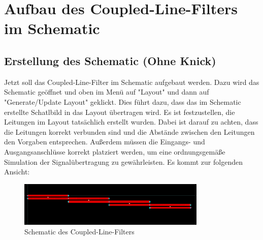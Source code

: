 \section{Aufbau des Coupled-Line-Filters im Schematic}
\subsection{Erstellung des Schematic (Ohne Knick)}
Jetzt soll das Coupled-Line-Filter im Schematic aufgebaut werden. Dazu wird das Schematic geöffnet und oben im Menü auf "Layout" und dann auf "Generate/Update Layout" geklickt. Dies führt dazu, dass das im Schematic erstellte Schatlbild in das Layout übertragen wird. Es ist festzustellen, die Leitungen im Layout tatsächlich erstellt wurden. Dabei ist darauf zu achten, dass die Leitungen korrekt verbunden sind und die Abstände zwischen den Leitungen den Vorgaben entsprechen. Außerdem müssen die Eingangs- und Ausgangsanschlüsse korrekt platziert werden, um eine ordnungsgemäße Simulation der Signalübertragung zu gewährleisten.
Es kommt zur folgenden Ansicht:
\begin{figure}[H]
    \centering
    \includegraphics[width=0.8\textwidth]{Pictures/Layout ohne Knick.png}
    \caption{Schematic des Coupled-Line-Filters}
\end{figure}

